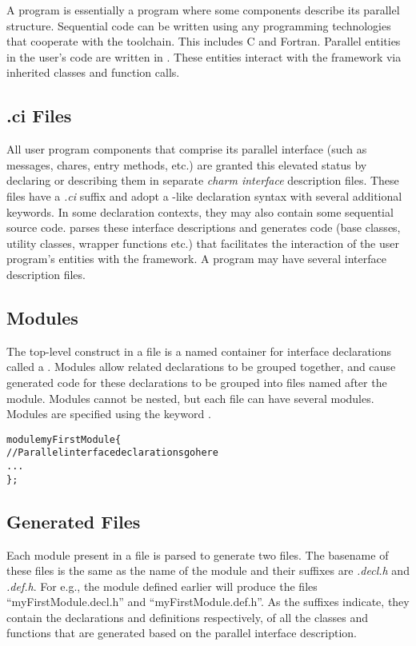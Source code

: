 A \charm program is essentially a \CC program where some components describe
its parallel structure. Sequential code can be written using any programming
technologies that cooperate with the \CC toolchain. This includes C and
Fortran. Parallel entities in the user's code are written in \CC{}. These
entities interact with the \charm framework via inherited classes and function
calls.


\subsection{.ci Files}
All user program components that comprise its parallel interface (such as
messages, chares, entry methods, etc.) are granted this elevated status by
declaring or describing them in separate \emph{charm interface} description
files. These files have a \emph{.ci} suffix and adopt a \CC-like declaration
syntax with several additional keywords. In some declaration contexts, they
may also contain some sequential \CC source code.
\charm parses these interface descriptions and generates \CC code (base
classes, utility classes, wrapper functions etc.) that facilitates the
interaction of the user program's entities with the framework.  A program may
have several interface description files.


\subsection{Modules}
The top-level construct in a \ci file is a named container for interface
declarations called a . Modules allow related declarations to be
grouped together, and cause generated code for these declarations to be grouped
into files named after the module. Modules cannot be nested, but each \ci file
can have several modules. Modules are specified using the keyword .

\begin{alltt}
module myFirstModule \{
    // Parallel interface declarations go here
    ...
\};
\end{alltt}


\subsection{Generated Files}

Each module present in a \ci file is parsed to generate two files. The basename
of these files is the same as the name of the module and their suffixes are
\emph{.decl.h} and \emph{.def.h}. For e.g., the module defined earlier will
produce the files ``myFirstModule.decl.h'' and ``myFirstModule.def.h''. As the
suffixes indicate, they contain the declarations and definitions respectively,
of all the classes and functions that are generated based on the parallel
interface description.

